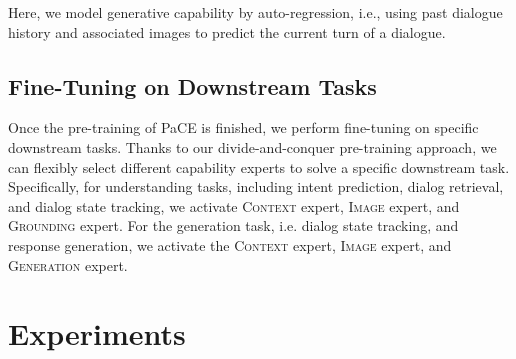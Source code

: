 \documentclass[11pt]{article}
\begin{document}
Here, we model generative capability by auto-regression, i.e., using past dialogue history  and associated images  to predict the current turn  of a dialogue.


\subsection{Fine-Tuning on Downstream Tasks}
Once the pre-training of PaCE is finished, we perform fine-tuning on specific downstream tasks. Thanks to our divide-and-conquer 
pre-training approach, we can flexibly select different capability experts to solve a specific downstream task. 
Specifically, for understanding tasks, including intent prediction, dialog retrieval, and dialog state tracking, we activate \textsc{Context} expert, \textsc{Image} expert, and \textsc{Grounding} expert. 
For the generation task, i.e. dialog state tracking, and response generation, we activate the \textsc{Context} expert, \textsc{Image} expert, and \textsc{Generation} expert. 




\section{Experiments}
\end{document}
